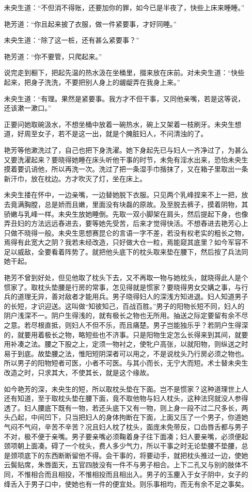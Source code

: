 \documentclass[a4paper,12pt,UTF8,twoside]{ctexbook}
\begin{document}
未央生道：“不但消不得账，还要加你的罪，如今已是半夜了，快些上床来睡睡。”

艳芳道：“你且起来披了衣服，做一件紧要事，才好同睡。”

未央生道：“除了这一桩，还有甚么紧要事？”

艳芳道：“你不要管，只爬起来。”

说完走到橱下，把起先温的热水汲在坐桶里，掇来放在床前。对未央生道：“快些起来，把身子洗洗，不要把别人身上的龌龊弄在我身上来。”

未央生道：“有理。果然是紧要事。我方才不但干事，又同他亲嘴，若是这等说，还该漱一漱口。”

正要问她取碗汲水，不想坐桶中放着一碗热水，碗上又架着一枝刷牙。未央生想道，好周至女子，若不是这一出，就是个腌脏妇人，不问清浊的了。

艳芳等他漱洗过了，自己也把下身洗濯。她下身起先已与妇人一齐净过了，为甚么又要洗濯起来？要晓得她睡在床头听他干事的时节，未免有淫水出来，恐怕未央生摸着要讥诮他，所以再洗一次。洗过了把一条湿手巾揩抹了，又在箱子里取出一条新汗巾，放在枕边。方才吹灭了灯，坐在床上。

未央生搂在怀中，一边亲嘴，一边替她脱下衣服。只见两个乳峰捏来不上一把，放去竟满胸膛，总是娇而且嫩，里面没有块磊的原故。及至脱去裤子，摸着阴物，其骄嫩与乳峰一样。未央生放她睡倒。先取一双小脚架在肩头，然后提起下身，也像弄丑妇的方法远远舂进去，要等她先受苦，后来才觉得快活。不想舂进去艳芳心上只做不晓得一般。未央生思想赛昆仑的言语一字不差，若没有权老实的粗长之物，焉得有此宽大之阴？我若未经改造，只好做大仓一粒，焉能窥其底里？如今军容不足以威敌，全要看着阵势了。就把他头底下的枕头取来垫在腰下，然后按了兵法同她干起。

艳芳不曾到好处，但见他取了枕头下去，又不再取一物与她枕头，就晓得此人是个惯家了。取枕头垫腰是行房的常事，怎见得就是惯家？要晓得男女交媾之事，与行兵的道理无异，善对敌者才能用兵。男子晓得妇人的深浅方知进退。妇人知道男子的长短，才识迎送。这叫做“知彼知己，百战百胜。”男子的阳物长短不同，妇人的阴户浅深不一。阴户生得浅的，就有极长之物也无所用。抽送之际定要留有余不尽之意。若尽根直抵，则妇人不但不乐，而且痛楚。男子岂能独乐乎？若阴户生得深的，就要用着极长之物，略短些也不济事。只是阳物生定怎么长得来到其间，就要用补凑之法。腰之下股之上，定须一物衬之，使牝户高张，以就阳物，则纵送之时易于到底。故垫腰之法，惟阳短阴深者可以用之，不是说枕头乃行房必须之物也。所以男子的阳物短者可医，小者不可医。与其小而长，无宁大而短。术士替未央生改造之时，只求其大，不使其长，就是这个缘故。

如今艳芳的深，未央生的短，所以取枕头垫在下面。岂不是惯家？这种道理世上人还有知道，至于取枕头垫在腰下面，竟不取他物与妇人枕头，这种法窍就没人参得透了。妇人腰底下既有一物，若还头底下又有一物，则上身一段不过二尺多长，两头凸起，中间凹下，只当把妇人的身体拘断在下面，上面又压了一个男子，你道她气闷不气闷，辛苦不辛苦？况且妇人枕了枕头，面庞未免带反，口齿唇舌都与男子不对，极不便于亲嘴。男子要亲嘴必须鞠着身子往下面凑；妇人要亲嘴，必须便起颈项朝上面凑。碍了一个枕头，费人多少气力，所以干事之时无论垫腰不垫腰，总是颈项底下的东西断断留他不得。会干事的，将要动手，就把枕头推过一边，使她云鬓贴席，朱唇面天，五官四肢没有一件不与男子相合。上下二孔又与别的肢体不同，不惟相合而且相投，不惟相投而且相出入。男子的玉麈入于女子阴中，女子的绛舌入于男子口中，使她也有一件的便宜处。则乐事相均，而无有余不足之事矣。
\end{document}
